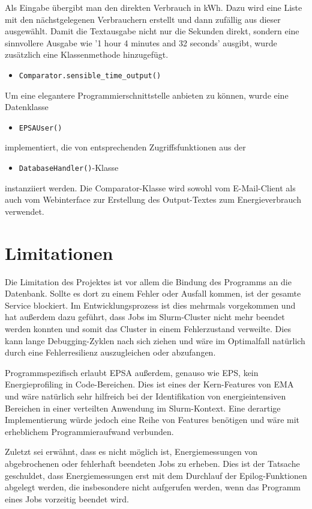 \documentclass[paper=a4, fontsize=11pt]{scrartcl} %
\numberwithin{equation}{section} %
\numberwithin{figure}{section} %
\numberwithin{table}{section} %
\begin{document}
Als Eingabe übergibt man den direkten Verbrauch in kWh. Dazu wird eine Liste mit den nächstgelegenen Verbrauchern erstellt und dann zufällig aus dieser ausgewählt. Damit die Textausgabe nicht nur die Sekunden direkt, sondern eine sinnvollere Ausgabe wie '1 hour 4 minutes and 32 seconds' ausgibt, wurde zusätzlich eine Klassenmethode hinzugefügt.
\begin{itemize}
    \item \texttt{Comparator.sensible_time_output()}
\end{itemize}
Um eine elegantere Programmierschnittstelle anbieten zu können, wurde eine Datenklasse 
\begin{itemize}
    \item \texttt{EPSAUser()}
\end{itemize} 
implementiert, die von entsprechenden Zugriffsfunktionen aus der
\begin{itemize}
    \item \texttt{DatabaseHandler()}-Klasse
\end{itemize} 
instanziiert werden. Die Comparator-Klasse wird sowohl vom E-Mail-Client als auch vom Webinterface zur Erstellung des Output-Textes zum Energieverbrauch verwendet.
\section{Limitationen}
Die Limitation des Projektes ist vor allem die Bindung des Programms an die Datenbank. Sollte es dort zu einem Fehler oder Ausfall kommen, ist der gesamte Service blockiert. Im Entwicklungsprozess ist dies mehrmals vorgekommen und hat außerdem dazu geführt, dass Jobs im Slurm-Cluster nicht mehr beendet werden konnten und somit das Cluster in einem Fehlerzustand verweilte. Dies kann lange Debugging-Zyklen nach sich ziehen und wäre im Optimalfall natürlich durch eine Fehlerresilienz auszugleichen oder abzufangen.

Programmspezifisch erlaubt EPSA außerdem, genauso wie EPS, kein Energieprofiling in Code-Bereichen. Dies ist eines der Kern-Features von EMA und wäre natürlich sehr hilfreich bei der Identifikation von energieintensiven Bereichen in einer verteilten Anwendung im Slurm-Kontext. Eine derartige Implementierung würde jedoch eine Reihe von Features benötigen und wäre mit erheblichem Programmieraufwand verbunden.

Zuletzt sei erwähnt, dass es nicht möglich ist, Energiemessungen von abgebrochenen oder fehlerhaft beendeten Jobs zu erheben. Dies ist der Tatsache geschuldet, dass Energiemessungen erst mit dem Durchlauf der Epilog-Funktionen abgelegt werden, die insbesondere nicht aufgerufen werden, wenn das Programm eines Jobs vorzeitig beendet wird.
\end{document}
